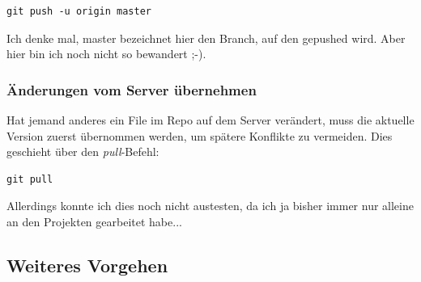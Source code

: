 \documentclass[twoside, 11pr]{article}
\begin{document}
\begin{lstlisting}
git push -u origin master
\end{lstlisting}

Ich denke mal, master bezeichnet hier den Branch, auf den gepushed wird. Aber hier bin ich noch nicht so bewandert ;-).

\begin{figure}[!tbph]
\end{figure}

\subsubsection{Änderungen vom Server übernehmen}

Hat jemand anderes ein File im Repo auf dem Server verändert, muss die aktuelle Version zuerst übernommen werden, um spätere Konflikte zu vermeiden. Dies geschieht über den \textit{pull}-Befehl:

\begin{lstlisting}
git pull
\end{lstlisting}

Allerdings konnte ich dies noch nicht austesten, da ich ja bisher immer nur alleine an den Projekten gearbeitet habe...


\subsection{Weiteres Vorgehen}
\end{document}
